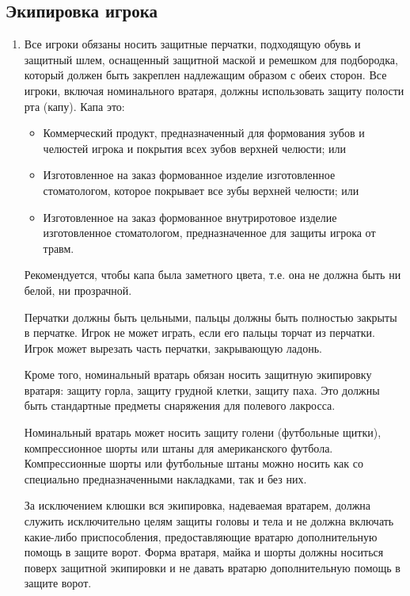 \documentclass[../main.tex]{subfiles}
\begin{document}
\subsection{Экипировка игрока}
\begin{enumerate}
\item Все игроки обязаны носить защитные перчатки, подходящую обувь и защитный шлем, оснащенный защитной маской и ремешком для подбородка, который должен быть закреплен надлежащим образом с обеих сторон. Все игроки, включая номинального вратаря, должны использовать защиту полости рта (капу).\newline
Капа это:
\begin{itemize}
    \item Коммерческий продукт, предназначенный для формования зубов и челюстей игрока и покрытия всех зубов верхней челюсти; или
    \item Изготовленное на заказ формованное изделие изготовленное стоматологом, которое покрывает все зубы верхней челюсти; или
    \item Изготовленное на заказ формованное внутриротовое изделие изготовленное стоматологом, предназначенное для защиты игрока от травм.
  \end{itemize}
  Рекомендуется, чтобы капа была заметного цвета, т.е. она не должна быть ни белой, ни прозрачной.

  Перчатки должны быть цельными, пальцы должны быть полностью закрыты в перчатке. Игрок не может играть, если его пальцы торчат из перчатки.\newline
  Игрок может вырезать часть перчатки, закрывающую ладонь.

  Кроме того, номинальный вратарь обязан носить защитную экипировку вратаря: защиту горла, защиту грудной клетки, защиту паха. Это должны быть стандартные предметы снаряжения для полевого лакросса.

  Номинальный вратарь может носить защиту голени (футбольные щитки), компрессионное шорты или штаны для американского футбола. Компрессионные шорты или футбольные штаны можно носить как со специально предназначенными накладками, так и без них.

  За исключением клюшки вся экипировка, надеваемая вратарем, должна служить исключительно целям защиты головы и тела и не должна включать какие-либо приспособления, предоставляющие вратарю дополнительную помощь в защите ворот. Форма вратаря, майка и шорты должны носиться поверх защитной экипировки и не давать вратарю дополнительную помощь в защите ворот.


\end{enumerate}
\end{document}
